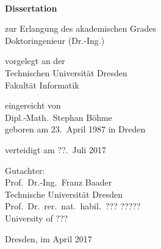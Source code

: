 \pagestyle{empty}

\begin{titlepage}
    \begin{center}
        \textbf{\textsf{\huge \thetitle}}\\
        \bigskip\bigskip\bigskip


        \Large
        \textbf{Dissertation}\\
        \bigskip\bigskip

        zur Erlangung des akademischen Grades\\
        Doktoringenieur (Dr.-Ing.)\\
        \bigskip\bigskip

        vorgelegt an der\\
        Technischen Universität Dresden\\
        Fakultät Informatik\\
        \bigskip\bigskip

        eingereicht von\\
        Dipl.-Math.\ Stephan Böhme\\
        geboren am 23.\ April 1987 in Dreden\\
        \bigskip\bigskip

        verteidigt am {??.\ Juli 2017}\\
        \vfill

        Gutachter:\\
        Prof.\ Dr.-Ing.\ Franz Baader\\
        Technische Universität Dresden\\[1ex]
        Prof.\ Dr.\ rer.\ nat.\ habil.\ ??? ?????\\
        University of ???

        \bigskip\bigskip

        Dresden, im April 2017
    \end{center}
\end{titlepage}

\cleardoublepage

\pagestyle{scrheadings}


\tableofcontents
